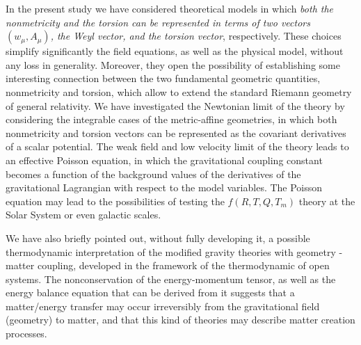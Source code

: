 \documentclass[aps,superscriptaddress, showpacs,preprintnumbers, superscriptaddress, nofootinbibt,twocolumn]{revtex4}
\begin{document}
In the present study we have considered theoretical models in which {\it  both the nonmetricity and the torsion can be represented in terms of two vectors $\left(w_{\mu},A_{\mu}\right)$, the Weyl vector, and the torsion vector}, respectively. These choices simplify significantly the field equations, as well as the physical model, without any loss in generality. Moreover, they open the possibility of establishing some interesting connection between the two fundamental geometric quantities, nonmetricity and torsion, which allow to extend the standard Riemann geometry of general relativity. We have investigated the Newtonian limit of the theory by considering the integrable cases of the metric-affine geometries, in which both nonmetricity and torsion vectors can be represented as the covariant derivatives of a scalar potential. The weak field and low velocity limit of the theory leads to an effective Poisson equation, in which the gravitational coupling constant becomes a function of the background values of the derivatives of the gravitational Lagrangian with respect to the model variables. The Poisson equation may lead to the possibilities of testing the $f\left(R,T,Q,T_m\right)$ theory at the Solar System or even galactic scales.

We have also briefly pointed out, without fully developing it, a possible thermodynamic interpretation of the modified gravity theories with geometry -matter coupling, developed in the framework of the thermodynamic of open systems. The nonconservation of the energy-momentum tensor, as well as the energy balance equation that can be derived from it suggests that a matter/energy transfer may occur irreversibly from the gravitational field (geometry) to matter, and that this kind of theories may describe matter creation processes. 
\end{document}
